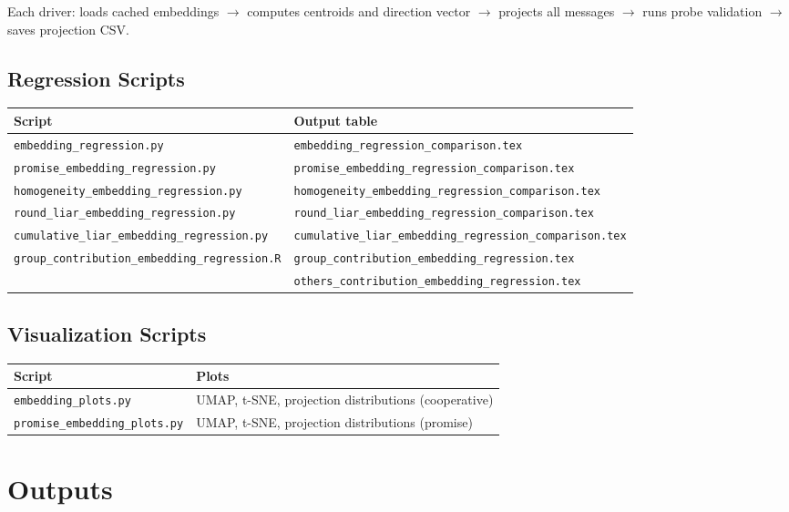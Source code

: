 \documentclass[11pt,oneside]{article}
\begin{document}
\medskip
Each driver: loads cached embeddings $\rightarrow$ computes centroids and direction vector $\rightarrow$ projects all messages $\rightarrow$ runs probe validation $\rightarrow$ saves projection CSV.

\subsection{Regression Scripts}

\begin{tabular}{ll}
\toprule
Script & Output table \\
\midrule
\texttt{embedding\_regression.py} & \texttt{embedding\_regression\_comparison.tex} \\
\texttt{promise\_embedding\_regression.py} & \texttt{promise\_embedding\_regression\_comparison.tex} \\
\texttt{homogeneity\_embedding\_regression.py} & \texttt{homogeneity\_embedding\_regression\_comparison.tex} \\
\texttt{round\_liar\_embedding\_regression.py} & \texttt{round\_liar\_embedding\_regression\_comparison.tex} \\
\texttt{cumulative\_liar\_embedding\_regression.py} & \texttt{cumulative\_liar\_embedding\_regression\_comparison.tex} \\
\texttt{group\_contribution\_embedding\_regression.R} & \texttt{group\_contribution\_embedding\_regression.tex} \\
 & \texttt{others\_contribution\_embedding\_regression.tex} \\
\bottomrule
\end{tabular}

\subsection{Visualization Scripts}

\begin{tabular}{ll}
\toprule
Script & Plots \\
\midrule
\texttt{embedding\_plots.py} & UMAP, t-SNE, projection distributions (cooperative) \\
\texttt{promise\_embedding\_plots.py} & UMAP, t-SNE, projection distributions (promise) \\
\bottomrule
\end{tabular}

\section{Outputs}
\end{document}
